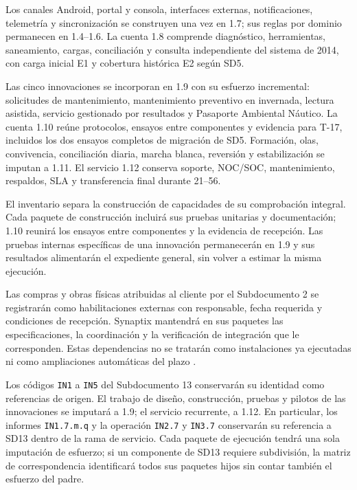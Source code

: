 Los canales Android, portal y consola, interfaces externas, notificaciones, telemetría y sincronización se construyen una vez en 1.7; sus reglas por dominio permanecen en 1.4--1.6. La cuenta 1.8 comprende diagnóstico, herramientas, saneamiento, cargas, conciliación y consulta independiente del sistema de 2014, con carga inicial E1 y cobertura histórica E2 según SD5.

Las cinco innovaciones se incorporan en 1.9 con su esfuerzo incremental: solicitudes de mantenimiento, mantenimiento preventivo en invernada, lectura asistida, servicio gestionado por resultados y Pasaporte Ambiental Náutico. La cuenta 1.10 reúne protocolos, ensayos entre componentes y evidencia para T-17, incluidos los dos ensayos completos de migración de SD5. Formación, olas, convivencia, conciliación diaria, marcha blanca, reversión y estabilización se imputan a 1.11. El servicio 1.12 conserva soporte, NOC/SOC, mantenimiento, respaldos, SLA y transferencia final durante 21--56.

El inventario separa la construcción de capacidades de su comprobación integral. Cada paquete de construcción incluirá sus pruebas unitarias y documentación; 1.10 reunirá los ensayos entre componentes y la evidencia de recepción. Las pruebas internas específicas de una innovación permanecerán en 1.9 y sus resultados alimentarán el expediente general, sin volver a estimar la misma ejecución.

Las compras y obras físicas atribuidas al cliente por el Subdocumento 2 se registrarán como habilitaciones externas con responsable, fecha requerida y condiciones de recepción. Synaptix mantendrá en sus paquetes las especificaciones, la coordinación y la verificación de integración que le corresponden. Estas dependencias no se tratarán como instalaciones ya ejecutadas ni como ampliaciones automáticas del plazo \parencite[cap.~11, p.~27; cap.~17, secc.~17.5, p.~42]{caso07}.

Los códigos \texttt{IN1} a \texttt{IN5} del Subdocumento 13 conservarán su identidad como referencias de origen. El trabajo de diseño, construcción, pruebas y pilotos de las innovaciones se imputará a 1.9; el servicio recurrente, a 1.12. En particular, los informes \texttt{IN1.7.m.q} y la operación \texttt{IN2.7} y \texttt{IN3.7} conservarán su referencia a SD13 dentro de la rama de servicio. Cada paquete de ejecución tendrá una sola imputación de esfuerzo; si un componente de SD13 requiere subdivisión, la matriz de correspondencia identificará todos sus paquetes hijos sin contar también el esfuerzo del padre.

